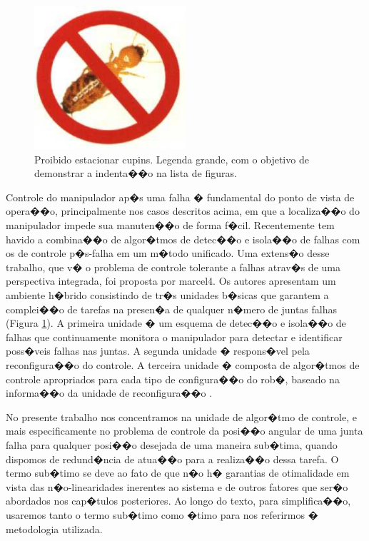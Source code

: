 \begin{figure}[ht]
\centering
\includegraphics[width=0.5\textwidth]{Cap1/cupim}
\caption{Proibido estacionar cupins. Legenda grande, com o objetivo de demonstrar a indenta��o na lista de figuras.}
\label{cupim}
\end{figure}

Controle do manipulador ap�s uma falha � fundamental do ponto de vista de opera��o, principalmente nos casos descritos acima, em que a localiza��o do manipulador impede sua manuten��o de forma f�cil. Recentemente tem havido a combina��o
de algor�tmos de detec��o e isola��o de falhas com os de controle p�s-falha em um m�todo unificado. Uma extens�o desse trabalho, que v� o problema de controle tolerante a falhas atrav�s de uma perspectiva integrada, foi proposta por
{marcel4}. Os autores apresentam um ambiente h�brido consistindo de tr�s unidades b�sicas que garantem a complei��o de tarefas na presen�a de qualquer n�mero de juntas falhas (Figura \ref{cupim}). A primeira unidade � um esquema de detec��o
e isola��o de falhas que continuamente monitora o manipulador para detectar e identificar poss�veis falhas nas juntas. A segunda unidade � respons�vel pela reconfigura��o do controle. A terceira unidade � composta de algor�tmos de
controle apropriados para cada tipo de configura��o do rob�, baseado na informa��o da unidade de reconfigura��o \cite{COFFEE2000}.

No presente trabalho nos concentramos na unidade de algor�tmo de controle, e mais especificamente no problema de controle da posi��o  angular de uma junta falha para qualquer posi��o desejada de uma maneira sub�tima, quando dispomos
de redund�ncia de atua��o para a realiza��o dessa tarefa. O termo sub�timo se deve ao fato de que n�o h� garantias de otimalidade em vista das n�o-linearidades inerentes ao sistema e de outros fatores que ser�o abordados nos cap�tulos posteriores. Ao longo do texto, para simplifica��o, usaremos tanto o termo sub�timo como �timo para nos referirmos � metodologia utilizada. \cite{ALMEIDAJUNIOR2011}

